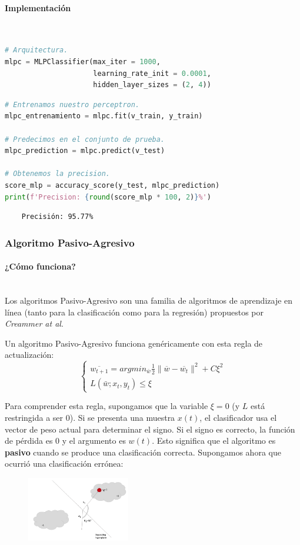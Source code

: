 \documentclass[letterpaper,11pt]{article}
\newcommand{\subsubsubsection}[1]{\paragraph{#1}\mbox{}\\}
\begin{document}
\newpage
\subsubsubsection{Implementación}

\begin{lstlisting}[language = Python]
# Arquitectura.
mlpc = MLPClassifier(max_iter = 1000, 
                     learning_rate_init = 0.0001, 
                     hidden_layer_sizes = (2, 4))
\end{lstlisting}

\begin{lstlisting}[language = Python]
# Entrenamos nuestro perceptron.
mlpc_entrenamiento = mlpc.fit(v_train, y_train)

# Predecimos en el conjunto de prueba.
mlpc_prediction = mlpc.predict(v_test)

# Obtenemos la precision.
score_mlp = accuracy_score(y_test, mlpc_prediction)
print(f'Precision: {round(score_mlp * 100, 2)}%')
\end{lstlisting}

\begin{verbatim}
    Precisión: 95.77%
\end{verbatim}

\subsubsection{Algoritmo Pasivo-Agresivo}

\subsubsubsection{¿Cómo funciona?}

Los algoritmos Pasivo-Agresivo son una familia de algoritmos de aprendizaje 
en línea (tanto para la clasificación como para la regresión) propuestos
por \textit{Creammer at al}. 

Un algoritmo Pasivo-Agresivo funciona genéricamente con esta regla de 
actualización:
\begin{equation*}
    \begin{cases}
        \overline{w_{t+1}} 
        = argmin_{\bar{w}} \frac{1}{2} \| \overline{w} -
        \overline{w_t}\|^2 + C \xi^2 \\ 
        L(\bar{w}; x_t, y_t) \leq \xi 
    \end{cases}
\end{equation*}

Para comprender esta regla, supongamos que la variable $\xi = 0$ (y $L$ está 
restringida a ser $0$). Si se presenta una muestra $x(t)$, el clasificador usa 
el vector de peso actual para determinar el signo. Si el signo es correcto, 
la función de pérdida es $0$ y el argumento es $w(t)$. Esto significa que el 
algoritmo es \textbf{pasivo} cuando se produce una clasificación correcta. 
Supongamos ahora que ocurrió una clasificación errónea:
\begin{figure}[h]
    \centering
    \includegraphics[width=0.4\textwidth]{./imagenes/pa1.png}
\end{figure}    
\end{document}
